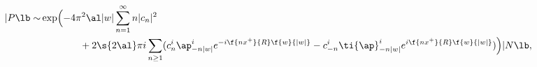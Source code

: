\begin{equation}
\begin{split}
|P\lb\sim&
\exp\Bigl(-4\pi^2\al |w| \sum_{n=1}^{\infty}n|c_{n}|^2
\\& \qquad \qquad +
2\s{2\al}\pi i\sum_{n\geq 1}(c^i_{n}\ap^i_{-n|w|}e^{-i\f{nx^+}{R}\f{w}{|w|}}
-c^i_{-n}\ti{\ap}^i_{-n|w|}e^{i\f{nx^+}{R}\f{w}{|w|}})
\Bigr)|N\lb, \label{bpp}
\end{split}
\end{equation}

